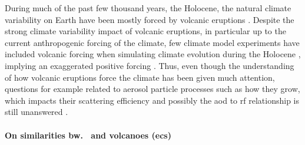\documentclass{ametsocV5}
\begin{document}
During much of the past few thousand years, the Holocene, the natural climate
variability on Earth have been mostly forced by volcanic eruptions \citep{sigl2022}.
Despite the strong climate variability impact of volcanic eruptions, in particular up to
the current anthropogenic forcing of the climate,
few climate model experiments have included volcanic forcing when simulating climate
evolution during the Holocene \citep{sigl2022}, implying an exaggerated positive forcing
\citep{gregory2016}. Thus, even though the understanding of how volcanic eruptions force
the climate has been given much attention, questions for example related to aerosol
particle processes such as how they grow, which impacts their scattering efficiency and
possibly the \ac{aod} to \ac{rf} relationship is still unanswered
\citep[e.g.][]{robock2000,zanchettin2019,marshall2020,marshall2022}.


\paragraph*{On similarities bw.\  and volcanoes (\ac{ecs})}
\end{document}
